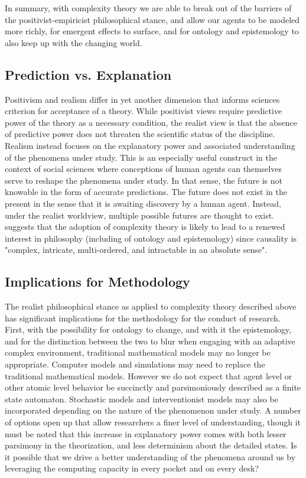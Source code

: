 \documentclass[12pt,letterpaper]{article}
\begin{document}
In summary, with complexity theory we are able to break out of the barriers of the positivist-empiricist philosophical stance, and allow our agents to be modeled more richly, for emergent effects to surface, and for ontology and epistemology to also keep up with the changing world.

\subsection{Prediction vs. Explanation}
Positivism and realism differ in yet another dimension that informs science\textquotesingle s criterion for acceptance of a theory. While positivist views require predictive power of the theory as a necessary condition, the realist view is that the absence of predictive power does not threaten the scientific status of the discipline. Realism instead focuses on the explanatory power and associated understanding of the phenomena under study. This is an especially useful construct in the context of social sciences where conceptions of human agents can themselves serve to reshape the phenomena under study. In that sense, the future is not knowable in the form of accurate predictions. The future does not exist in the present in the sense that it is awaiting discovery by a human agent. Instead, under the realist worldview, multiple possible futures are thought to exist. \cite{Richardson2011} suggests that the adoption of complexity theory is likely to lead to a renewed interest in philosophy (including of ontology and epistemology) since causality is "complex, intricate, multi-ordered, and intractable in an absolute sense".

\subsection{Implications for Methodology}
The realist philosophical stance as applied to complexity theory described above has significant implications for the methodology for the conduct of research. First, with the possibility for ontology to change, and with it the epistemology, and for the distinction between the two to blur when engaging with an adaptive complex environment, traditional mathematical models may no longer be appropriate. Computer models and simulations may need to replace the traditional mathematical models. However we do not expect that agent level or other atomic level behavior be succinctly and parsimoniously described as a finite state automaton. Stochastic models and interventionist models may also be incorporated depending on the nature of the phenomenon under study. A number of options open up that allow researchers a finer level of understanding, though it must be noted that this increase in explanatory power comes with both lesser parsimony in the theorization, and less determinism about the detailed states. Is it possible that we drive a better understanding of the phenomena around us by leveraging the computing capacity in every pocket and on every desk?
\end{document}
